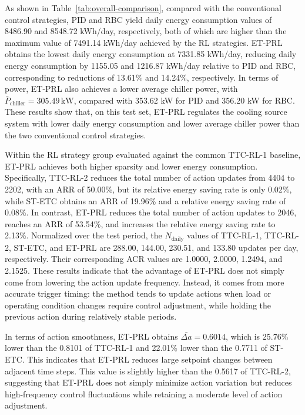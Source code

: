 ﻿\documentclass[preprint,12pt,number]{elsarticle}
\begin{document}
As shown in Table~\ref{tab:overall-comparison}, compared with the conventional control strategies, PID and RBC yield daily energy consumption values of 8486.90 and 8548.72 kWh/day, respectively, both of which are higher than the maximum value of 7491.14 kWh/day achieved by the RL strategies. ET-PRL obtains the lowest daily energy consumption at 7331.85 kWh/day, reducing daily energy consumption by 1155.05 and 1216.87 kWh/day relative to PID and RBC, corresponding to reductions of 13.61\% and 14.24\%, respectively. In terms of power, ET-PRL also achieves a lower average chiller power, with \(\bar{P}_{\text{chiller}}=305.49\,\mathrm{kW}\), compared with 353.62 kW for PID and 356.20 kW for RBC. These results show that, on this test set, ET-PRL regulates the cooling source system with lower daily energy consumption and lower average chiller power than the two conventional control strategies.

Within the RL strategy group evaluated against the common TTC-RL-1 baseline, ET-PRL achieves both higher sparsity and lower energy consumption. Specifically, TTC-RL-2 reduces the total number of action updates from 4404 to 2202, with an ARR of 50.00\%, but its relative energy saving rate is only 0.02\%, while ST-ETC obtains an ARR of 19.96\% and a relative energy saving rate of 0.08\%. In contrast, ET-PRL reduces the total number of action updates to 2046, reaches an ARR of 53.54\%, and increases the relative energy saving rate to 2.13\%. Normalized over the test period, the \(N_{\text{daily}}\) values of TTC-RL-1, TTC-RL-2, ST-ETC, and ET-PRL are 288.00, 144.00, 230.51, and 133.80 updates per day, respectively. Their corresponding ACR values are 1.0000, 2.0000, 1.2494, and 2.1525. These results indicate that the advantage of ET-PRL does not simply come from lowering the action update frequency. Instead, it comes from more accurate trigger timing: the method tends to update actions when load or operating condition changes require control adjustment, while holding the previous action during relatively stable periods.

In terms of action smoothness, ET-PRL obtains \(\bar{\Delta a}=0.6014\), which is 25.76\% lower than the 0.8101 of TTC-RL-1 and 22.01\% lower than the 0.7711 of ST-ETC. This indicates that ET-PRL reduces large setpoint changes between adjacent time steps. This value is slightly higher than the 0.5617 of TTC-RL-2, suggesting that ET-PRL does not simply minimize action variation but reduces high-frequency control fluctuations while retaining a moderate level of action adjustment.
\end{document}
